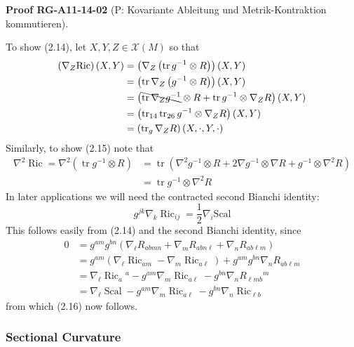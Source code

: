 \documentclass[10pt, letterpaper]{article}
\newcommand{\CustomHeading}[3]{%
  \par\medskip\noindent%
  \textbf{#1 #2} \textnormal{(#3)}.\enskip%
}
\newenvironment{PROOF}[2]{\begin{unitbox}\CustomHeading{Proof}{#1}{#2}}{\end{unitbox}}
\begin{document}
\begin{PROOF}{RG-A11-14-02}{P: Kovariante Ableitung und Metrik-Kontraktion kommutieren}
To show (2.14), let $X, Y, Z \in \mathscr{X}(M)$ so that
$$
\begin{aligned}
\left(\nabla_{Z} \mathrm{Ric}\right)(X, Y) 
& =\left(\nabla_{Z}\left(\operatorname{tr} g^{-1} \otimes R\right)\right)(X, Y) \\
& =\left(\operatorname{tr} \nabla_{Z}\left(g^{-1} \otimes R\right)\right)(X, Y) \\
& =\left(\bcancel{\operatorname{tr} \nabla_{Z} g^{-1}} \otimes R+\operatorname{tr} g^{-1} \otimes \nabla_{Z} R\right)(X, Y) \\
& =\left(\operatorname{tr}_{14} \operatorname{tr}_{26} g^{-1} \otimes \nabla_{Z} R\right)(X, Y) \\
& =\left(\operatorname{tr}_{g} \nabla_{Z} R\right)(X, \cdot, Y, \cdot)
\end{aligned}
$$
Similarly, to show (2.15) note that
$$
\begin{aligned}
\nabla^{2} \operatorname{Ric}=\nabla^{2}\left(\operatorname{tr} g^{-1} \otimes R\right) & =\operatorname{tr}\left(\nabla^{2} g^{-1} \otimes R+2 \nabla g^{-1} \otimes \nabla R+g^{-1} \otimes \nabla^{2} R\right) \\
& =\operatorname{tr} g^{-1} \otimes \nabla^{2} R
\end{aligned}
$$
In later applications we will need the contracted second Bianchi identity:
$$
g^{j k} \nabla_{k} \operatorname{Ric}_{i j}=\frac{1}{2} \nabla_{i} \mathrm{Scal}
$$
This follows easily from (2.14) and the second Bianchi identity, since
$$
\begin{aligned}
0 & =g^{a m} g^{b n}\left(\nabla_{\ell} R_{a b m n}+\nabla_{m} R_{a b n \ell}+\nabla_{n} R_{a b \ell m}\right) \\
& =g^{a m}\left(\nabla_{\ell} \operatorname{Ric}_{a m}-\nabla_{m} \operatorname{Ric}_{a \ell}\right)+g^{a m} g^{b n} \nabla_{n} R_{a b \ell m} \\
& =\nabla_{\ell} \operatorname{Ric}_{a}{ }^{a}-g^{a m} \nabla_{m} \operatorname{Ric}_{a \ell}-g^{b n} \nabla_{n} R_{\ell m b}{ }^{m} \\
& =\nabla_{\ell} \operatorname{Scal}-g^{a m} \nabla_{m} \operatorname{Ric}_{a \ell}-g^{b n} \nabla_{n} \operatorname{Ric}_{\ell b}
\end{aligned}
$$
from which (2.16) now follows.
\end{PROOF}



\subsubsection*{Sectional Curvature}
\end{document}
